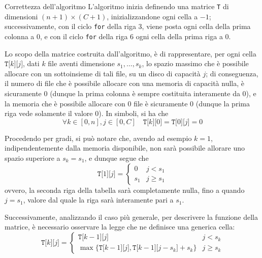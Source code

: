 \documentclass[a4paper, 12pt]{report}
\begin{document}
    \begin{framedobs}{Correttezza dell'algoritmo}
        L'algoritmo inizia definendo una matrice \texttt{T} di dimensioni $(n + 1) \times (C + 1)$, inizializzandone ogni cella a $-1$; successivamente, con il ciclo \texttt{for} della riga 3, viene posta ogni cella della prima colonna a 0, e con il ciclo \texttt{for} della riga 6 ogni cella della prima riga a 0.

        Lo scopo della matrice costruita dall'algoritmo, è di rappresentare, per ogni cella $\texttt{T[}k\texttt{][}j\texttt{]}$, dati $k$ file aventi dimensione $s_1, \ldots, s_k$, lo spazio massimo che è possibile allocare con un sottoinsieme di tali file, su un disco di capacità $j$; di conseguenza, il numero di file che è possibile allocare con una memoria di capacità nulla, è sicuramente 0 (dunque la prima colonna è sempre costituita interamente da 0), e la memoria che è possibile allocare con 0 file è sicuramente 0 (dunque la prima riga vede solamente il valore 0). In simboli, si ha che $$\forall k \in [0, n], j \in [0, C] \quad \texttt{T[}k\texttt{][}0\texttt{]} = \texttt{T[}0\texttt{][}j\texttt{]} = 0$$

        Procedendo per gradi, si può notare che, avendo ad esempio $k = 1$, indipendentemente dalla memoria disponibile, non sarà possibile allorare uno spazio superiore a $s_k = s_1$, e dunque segue che $$\texttt{T[}1\texttt{][}j\texttt{]}= \left \{ \begin{array}{ll} 0 & j < s_1 \\ s_1 & j \ge s_1 \end{array} \right.$$ ovvero, la seconda riga della tabella sarà completamente nulla, fino a quando $j = s_1$, valore dal quale la riga sarà interamente pari a $s_1$.

        Successivamente, analizzando il caso più generale, per descrivere la funzione della matrice, è necessario osservare la legge che ne definisce una generica cella: $$\texttt{T[}k\texttt{][}j\texttt{]}=\left \{ \begin{array}{ll}\texttt{T[}k - 1\texttt{][}j\texttt{]} & j < s_k \\ \max\{\texttt{T[}k - 1\texttt{][}j\texttt{]}, \texttt{T[}k-1\texttt{][}j - s_k\texttt{]} + s_k\} & j \ge s_k \end{array} \right.$$


\end{framedobs}
\end{document}
